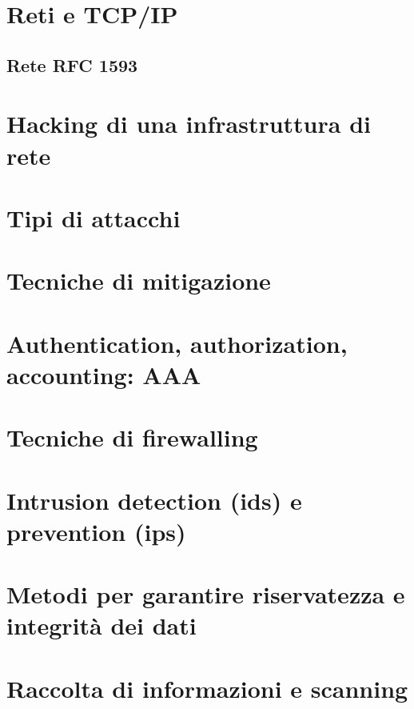 \appendix

\chapter{Reti e TCP/IP}                                                 %
\section{Rete RFC 1593}

\chapter{Hacking di una infrastruttura di rete}                         %

\chapter{Tipi di attacchi}                                              %

\chapter{Tecniche di mitigazione}                                       %

\chapter{Authentication, authorization, accounting: AAA}                %

\chapter{Tecniche di firewalling}                                       %

\chapter{Intrusion detection (ids) e prevention (ips)}                  %
 
\chapter{Metodi per garantire riservatezza e integrità dei dati} 		%
  
\chapter{Raccolta di informazioni e scanning} 							%
   
